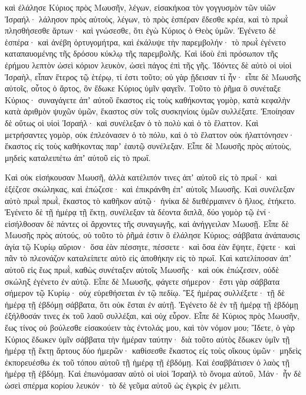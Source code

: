 {καὶ ἐλάλησε Κύριος πρὸς Μωυσῆν, λέγων,
εἰσακήκοα τὸν γογγυσμὸν τῶν υἱῶν Ἰσραήλ· λάλησον πρὸς αὐτοὺς, λέγων, τὸ πρὸς ἑσπέραν ἔδεσθε κρέα, καὶ τὸ πρωῒ πλησθήσεσθε ἄρτων· καὶ γνώσεσθε, ὅτι ἐγὼ Κύριος ὁ Θεὸς ὑμῶν.
Ἐγένετο δὲ ἑσπέρα· καὶ ἀνέβη ὀρτυγομήτρα, καὶ ἐκάλυψε τὴν παρεμβολήν· τὸ πρωῒ ἐγένετο καταπαυομένης τῆς δρόσου κύκλῳ τῆς παρεμβολῆς.
Καὶ ἰδοὺ ἐπὶ πρόσωπον τῆς ἐρήμου λεπτὸν ὡσεὶ κόριον λευκὸν, ὡσεὶ πάγος ἐπὶ τῆς γῆς.
Ἰδόντες δὲ αὐτὸ οἱ υἱοὶ Ἰσραὴλ, εἶπαν ἕτερος τῷ ἑτέρῳ, τί ἐστι τοῦτο; οὐ γὰρ ᾔδεισαν τί ἦν· εἶπε δὲ Μωυσῆς αὐτοῖς, οὗτος ὁ ἄρτος, ὃν ἔδωκε Κύριος ὑμῖν φαγεῖν.
Τοῦτο τὸ ῥῆμα ὃ συνέταξε Κύριος· συναγάγετε ἀπʼ αὐτοῦ ἕκαστος εἰς τοὺς καθήκοντας γομὸρ, κατὰ κεφαλὴν κατὰ ἀριθμὸν ψυχῶν ὑμῶν, ἕκαστος σὺν τοῖς συσκηνίοις ὑμῶν συλλέξατε.
Ἐποίησαν δὲ οὕτως οἱ υἱοὶ Ἰσραήλ· καὶ συνέλεξαν ὁ τὸ πολὺ καὶ ὁ τὸ ἔλαττον.
Καὶ μετρήσαντες γομὸρ, οὐκ ἐπλεόνασεν ὁ τὸ πόλυ, καὶ ὁ τὸ ἔλαττον οὐκ ἠλαττόνησεν· ἕκαστος εἰς τοὺς καθήκοντας παρʼ ἑαυτῷ συνέλεξαν.
Εἶπε δὲ Μωυσῆς πρὸς αὐτοὺς, μηδεὶς καταλειπέτω ἀπʼ αὐτοῦ εἰς τὸ πρωΐ.
\par }{\PP {}Καὶ οὐκ εἰσήκουσαν Μωυσῆ, ἀλλὰ κατέλιπόν τινες ἀπʼ αὐτοῦ εἰς τὸ πρωΐ· καὶ ἐξέζεσε σκώληκας, καὶ ἐπώζεσε· καὶ ἐπικράνθη ἐπʼ αὐτοῖς Μωυσῆς.
Καὶ συνέλεξαν αὐτὸ πρωῒ πρωῒ, ἕκαστος τὸ καθῆκον αὐτῷ· ἡνίκα δὲ διεθέρμαινεν ὁ ἥλιος, ἐτήκετο.
Ἐγένετο δὲ τῇ ἡμέρᾳ τῇ ἕκτῃ, συνέλεξαν τὰ δέοντα διπλᾶ, δύο γομὸρ τῷ ἑνί· εἰσήλθοσαν δὲ πάντες οἱ ἄρχοντες τῆς συναγωγῆς, καὶ ἀνήγγειλαν Μωυσῇ.
Εἶπε δὲ Μωυσῆς πρὸς αὐτούς, οὐ τοῦτο τὸ ῥῆμά ἐστιν ὃ ἐλάλησε Κύριος; σάββατα ἀνάπαυσις ἁγία τῷ Κυρίῳ αὔριον· ὅσα ἐὰν πέσσητε, πέσσετε· καὶ ὅσα ἐὰν ἕψητε, ἕψετε· καὶ πᾶν τὸ πλεονάζον καταλείπετε αὐτὸ εἰς ἀποθήκην εἰς τὸ πρωΐ.
Καὶ κατελίποσαν ἀπʼ αὐτοῦ εἰς ἕως πρωῒ, καθὼς συνέταξεν αὐτοῖς Μωυσῆς· καὶ οὐκ ἐπώζεσεν, οὐδὲ σκώληξ ἐγένετο ἐν αὐτῷ.
Εἶπε δὲ Μωυσῆς, φάγετε σήμερον· ἔστι γὰρ σάββατα σήμερον τῷ Κυρίῳ· οὐχ εὑρεθήσεται ἐν τῷ πεδίῳ.
Ἓξ ἡμέρας συλλέξετε· τῇ δὲ ἡμέρᾳ τῇ ἑβδόμῃ σάββατα, ὅτι οὐκ ἔσται ἐν αὐτῇ.
Ἐγένετο δὲ ἐν τῇ ἡμέρᾳ τῇ ἑβδόμῃ ἐξήλθοσάν τινες ἐκ τοῦ λαοῦ συλλέξαι, καὶ οὐχ εὗρον.
Εἶπε δὲ Κύριος πρὸς Μωυσῆν, ἕως τίνος οὐ βούλεσθε εἰσακούειν τὰς ἐντολάς μου, καὶ τὸν νόμον μου;
Ἴδετε, ὁ γὰρ Κύριος ἔδωκεν ὑμῖν σάββατα τὴν ἡμέραν ταύτην· διὰ τοῦτο αὐτὸς ἔδωκεν ὑμῖν τῇ ἡμέρᾳ τῇ ἕκτῃ ἄρτους δύο ἡμερῶν· καθίσεσθε ἕκαστος εἰς τοὺς οἴκους ὑμῶν· μηδεὶς ἐκπορευέσθω ἐκ τοῦ τόπου αὐτοῦ τῇ ἡμέρᾳ τῇ ἑβδόμῃ.
Καὶ ἐσαββάτισεν ὁ λαὸς τῇ ἡμέρᾳ τῇ ἑβδόμῃ.
Καὶ ἐπωνόμασαν αὐτὸ οἱ υἱοὶ Ἰσραὴλ τὸ ὄνομα αὐτοῦ, Μάν· ἦν δὲ ὡσεὶ σπέρμα κορίου λευκόν· τὸ δὲ γεῦμα αὐτοῦ ὡς ἐγκρὶς ἐν μέλιτι.
}
